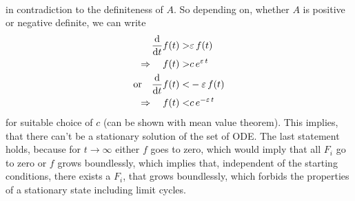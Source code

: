 \documentclass{article}
\begin{document}
\begin{appendices}
\begin{align*}
\end{align*}
in contradiction to the definiteness of $A$. So depending on, whether $A$ is positive or negative definite, we can write
\begin{align*}
    \frac{\text{d}}{\text{d}t} f(t) >& \varepsilon\,f(t)\\
    \Rightarrow\quad f(t) >& c\,e^{\varepsilon\,t}\\
    \text{or}\quad \frac{\text{d}}{\text{d}t} f(t) <& -\varepsilon\,f(t)\\
    \Rightarrow\quad f(t) <& c\,e^{-\varepsilon\,t}\\
\end{align*}
for suitable choice of $c$ (can be shown with mean value theorem). This implies, that there can't be a stationary solution of the set of ODE. The last statement holds, because for $t\rightarrow\infty$ either $f$ goes to zero, which would imply that all $F_i$ go to zero or $f$ grows boundlessly, which implies that, independent of the starting conditions, there exists a $F_i$, that grows boundlessly, which forbids the properties of a stationary state including limit cycles.



\end{appendices}

\printbibliography
\end{document}

